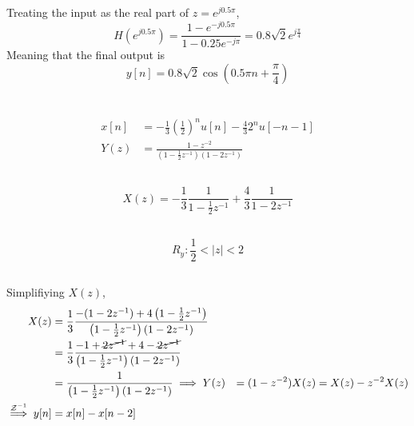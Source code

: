 \documentclass{article}
\begin{document}
\subsection{}

Treating the input as the real part of \(z = e^{j 0.5 \pi}\),
\begin{equation}
    H(e^{j 0.5 \pi}) = \frac{1 - e^{-j 0.5 \pi}}{1 - 0.25e^{-j\pi}} = 0.8 \sqrt{2} e^{j \frac{\pi}{4}}
\end{equation}
Meaning that the final output is
\begin{equation}
    y[n] = 0.8 \sqrt{2} \cos\left(0.5 \pi n + \frac{\pi}{4}\right)
\end{equation}

\newpage
\section{}

\begin{align}
    x[n] &= -\frac{1}{3} \left(\frac{1}{2}\right)^n u[n] - \frac{4}{3} 2^n u[-n - 1] \\
    Y(z) &= \frac{1 - z^{-2}}{\left(1 - \frac{1}{2} z^{-1}\right) (1 - 2z^{-1})}
\end{align}

\subsection{}

\begin{equation}
    X(z) = -\frac{1}{3} \frac{1}{1 - \frac{1}{2} z^{-1}} + \frac{4}{3} \frac{1}{1 - 2z^{-1}}
\end{equation}

\subsection{}

\begin{equation}
    R_y: \frac{1}{2} < |z| < 2
\end{equation}


\subsection{}

Simplifiying \(X(z)\),
\begin{align}
    X(z) &= \frac{1}{3} \frac{-(1 - 2z^{-1}) + 4 \left(1 - \frac{1}{2} z^{-1}\right)}{\left(1 - \frac{1}{2} z^{-1}\right) (1 - 2z^{-1})} \\
    &= \frac{1}{3} \frac{-1 + \cancel{2z^{-1}} + 4 - \cancel{2z^{-1}}}{\left(1 - \frac{1}{2} z^{-1}\right) (1 - 2z^{-1})} \\
    &= \frac{1}{\left(1 - \frac{1}{2} z^{-1}\right) (1 - 2z^{-1})}
    \implies Y(z) &= (1 - z^{-2}) X(z) = X(z) - z^{-2} X(z) \\
    \overset{\mathcal{Z}^{-1}}{\implies} y[n] &= x[n] - x[n - 2]
\end{align}
\end{document}
